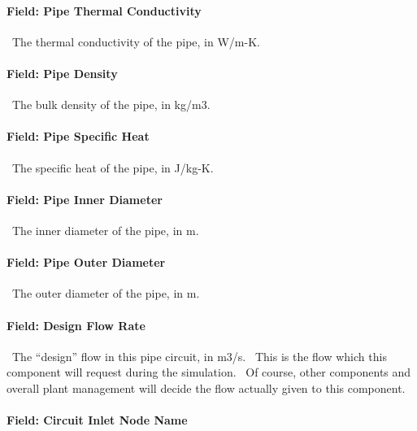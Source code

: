 \paragraph{Field: Pipe Thermal Conductivity}\label{field-pipe-thermal-conductivity-001}

~The thermal conductivity of the pipe, in W/m-K.

\paragraph{Field: Pipe Density}\label{field-pipe-density-000}

~The bulk density of the pipe, in kg/m3.

\paragraph{Field: Pipe Specific Heat}\label{field-pipe-specific-heat-000}

~The specific heat of the pipe, in J/kg-K.

\paragraph{Field: Pipe Inner Diameter}\label{field-pipe-inner-diameter}

~The inner diameter of the pipe, in m.

\paragraph{Field: Pipe Outer Diameter}\label{field-pipe-outer-diameter}

~The outer diameter of the pipe, in m.

\paragraph{Field: Design Flow Rate}\label{field-design-flow-rate-001}

~The ``design'' flow in this pipe circuit, in m3/s.~ This is the flow which this component will request during the simulation.~ Of course, other components and overall plant management will decide the flow actually given to this component.

\paragraph{Field: Circuit Inlet Node Name}\label{field-circuit-inlet-node-name}


